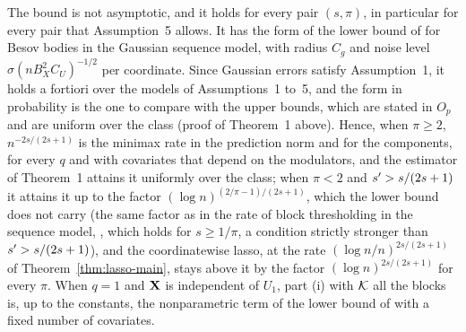 The bound is not asymptotic, and it holds for every pair $(s,\pi)$, in
particular for every pair that Assumption~5 allows. It has the form of the
lower bound of \citet[Theorem~5]{Donoho-Johnstone-1998} for Besov bodies in
the Gaussian sequence model, with radius $C_g$ and noise level
$\sigma(nB_X^{2}C_U)^{-1/2}$ per coordinate. Since Gaussian errors satisfy
Assumption~1, it holds a fortiori over the models of Assumptions~1 to~5, and
the form in probability is the one to compare with the upper bounds, which are
stated in $O_p$ and are uniform over the class (proof of Theorem~1 above).
Hence, when $\pi \ge 2$, $n^{-2s/(2s+1)}$ is the minimax rate in the
prediction norm and for the components, for every $q$ and with covariates
that depend on the modulators, and the estimator of Theorem~1 attains it
uniformly over the class; when $\pi < 2$ and $s' > s/(2s+1)$ it attains it
up to the factor $(\log n)^{(2/\pi-1)/(2s+1)}$, which the lower bound does not
carry
(the same factor as in the rate of block thresholding in the sequence model,
\citealp[Theorem~4]{Cai-1999}, which holds for $s \ge 1/\pi$, a condition
strictly stronger than $s' > s/(2s+1)$), and the coordinatewise lasso, at the rate $(\log n/n)^{2s/(2s+1)}$ of
Theorem~\ref{thm:lasso-main}, stays above it by the factor
$(\log n)^{2s/(2s+1)}$ for every $\pi$. When $q = 1$ and $\mathbf{X}$ is independent
of $U_1$, part (i) with $\mathcal{K}$ all the blocks is, up to the constants, the
nonparametric term of the lower bound of
\citet[Theorem~1, eqs.~3.6 and~3.7]{Klopp-Pensky-2015} with a fixed number of
covariates.

